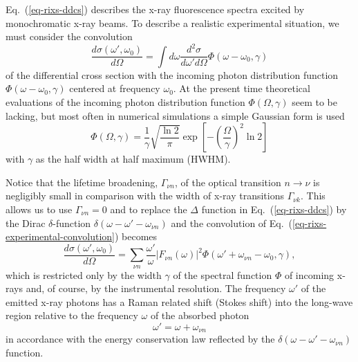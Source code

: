 \documentclass[a4paper,11pt,twoside,openright]{book}
\begin{document}
Eq.~(\ref{eq-rixs-ddcs}) describes the x-ray fluorescence spectra excited by monochromatic x-ray beams.
To describe a realistic experimental situation, we must consider the convolution\cite{Luo-JPB27-4169,Luo-PRB52-14479,Gelmukhanov-PR312-87}
\begin{equation}
  \label{eq-rixs-experimental-convolution}
  \frac{d\sigma(\omega',\omega_0)}{d\Omega}=\int d\omega\frac{d^2\sigma}{d\omega'd\Omega}\Phi(\omega-\omega_0,\gamma)
\end{equation}
of the differential cross section with the incoming photon distribution function
$\Phi(\omega-\omega_0,\gamma)$ centered at frequency $\omega_0$. At the present time
theoretical evaluations of the incoming photon distribution function $\Phi(\Omega,\gamma)$
seem to be lacking, but most often in numerical simulations a simple Gaussian form is used\cite{Gelmukhanov-PR312-87}
\begin{equation}
  \Phi(\Omega,\gamma)=\frac{1}{\gamma}\sqrt{\frac{\ln2}{\pi}}\exp\left[-\left(\frac{\Omega}{\gamma}\right)^2\ln2\right]
\end{equation}
with $\gamma$ as the half width at half maximum (HWHM).

Notice that the lifetime broadening, $\Gamma_{\nu n}$, of the optical transition $n\rightarrow\nu$
is negligibly small in comparison with the width of x-ray transitions $\Gamma_{\nu k}$. This allows
us to use $\Gamma_{\nu n}=0$ and to replace the $\Delta$ function in Eq.~(\ref{eq-rixs-ddcs}) by
the Dirac $\delta$-function $\delta(\omega-\omega'-\omega_{\nu n})$ and the convolution of Eq.~(\ref{eq-rixs-experimental-convolution})
becomes\cite{Luo-JPB27-4169,Luo-PRB52-14479}
\begin{equation}
  \label{eq-rixs-life-convolution}
  \frac{d\sigma(\omega',\omega_0)}{d\Omega}
  =\sum_{\nu n}\frac{\omega'}{\omega}|F_{\nu n}(\omega)|^2\Phi(\omega'+\omega_{\nu n}-\omega_0,\gamma),
\end{equation}
which is restricted only by the width $\gamma$ of the spectral function $\Phi$ of incoming x-rays
and, of course, by the instrumental resolution. The frequency $\omega'$ of the emitted x-ray
photons has a Raman related shift (Stokes shift) into the long-wave region relative to the frequency
$\omega$ of the absorbed photon
\begin{equation}
  \omega'=\omega+\omega_{\nu n}
\end{equation}
in accordance with the energy conservation law reflected by the $\delta(\omega-\omega'-\omega_{\nu n})$ function.
\end{document}
